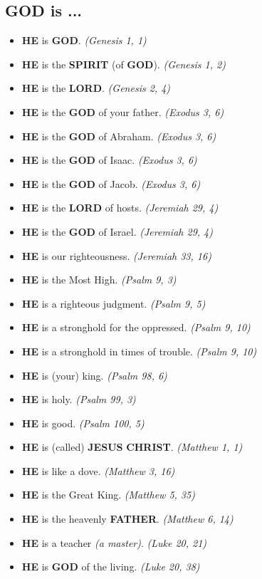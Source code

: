 \documentclass[12pt,a5paper]{article}
\newcommand{\Christ}[0]{\textbf{CHRIST}}
\newcommand{\God}[0]{\textbf{GOD}}
\newcommand{\Father}[0]{\textbf{FATHER}}
\newcommand{\He}[0]{\textbf{HE}}
\newcommand{\Jesus}[0]{\textbf{JESUS}}
\newcommand{\Lord}[0]{\textbf{LORD}}
\newcommand{\Spirit}[0]{\textbf{SPIRIT}}
\begin{document}
	\newpage
	\subsection{{\God} is ...}
		\begin{itemize}[nosep]
			\item {\He} is {\God}. \textit{(Genesis 1, 1)}
			\item {\He} is the {\Spirit} (of {\God}). \textit{(Genesis 1, 2)}
			\item {\He} is the {\Lord}. \textit{(Genesis 2, 4)}
			\item {\He} is the {\God} of your father. \textit{(Exodus 3, 6)}
			\item {\He} is the {\God} of Abraham. \textit{(Exodus 3, 6)}
			\item {\He} is the {\God} of Isaac. \textit{(Exodus 3, 6)}
			\item {\He} is the {\God} of Jacob. \textit{(Exodus 3, 6)}
			\item {\He} is the {\Lord} of hosts. \textit{(Jeremiah 29, 4)}
			\item {\He} is the {\God} of Israel. \textit{(Jeremiah 29, 4)}
			\item {\He} is our righteousness. \textit{(Jeremiah 33, 16)}
			\item {\He} is the Most High. \textit{(Psalm 9, 3)}
			\item {\He} is a righteous judgment. \textit{(Psalm 9, 5)}
			\item {\He} is a stronghold for the oppressed. \textit{(Psalm 9, 10)}
			\item {\He} is a stronghold in times of trouble. \textit{(Psalm 9, 10)}
			\item {\He} is (your) king. \textit{(Psalm 98, 6)}
			\item {\He} is holy. \textit{(Psalm 99, 3)}
			\item {\He} is good. \textit{(Psalm 100, 5)}
			\item {\He} is (called) {\Jesus} {\Christ}. \textit{(Matthew 1, 1)}
			\item {\He} is like a dove. \textit{(Matthew 3, 16)}
			\item {\He} is the Great King. \textit{(Matthew 5, 35)}
			\item {\He} is the heavenly {\Father}. \textit{(Matthew 6, 14)}
			\item {\He} is a teacher \textit{(a master)}. \textit{(Luke 20, 21)}
			\item {\He} is {\God} of the living. \textit{(Luke 20, 38)}		

\end{itemize}
\end{document}
